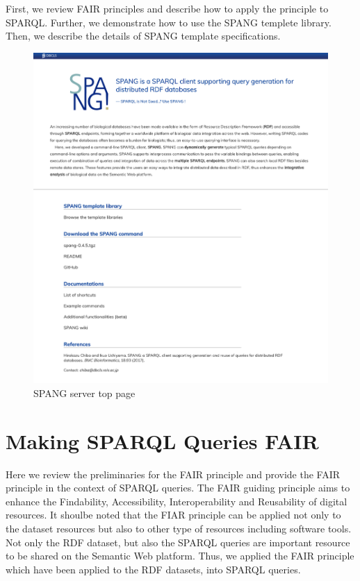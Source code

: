 \documentclass[runningheads]{llncs}
\begin{document}
First, we review FAIR principles and describe how to apply the principle to SPARQL.
Further, we demonstrate how to use the SPANG templete library.
Then, we describe the details of SPANG template specifications.


\begin{figure}
\center
\includegraphics[width=1.0\textwidth]{spang_top.png}
\caption{SPANG server top page}
\label{fig:spang_top}
\end{figure}


\section{Making SPARQL Queries FAIR}

Here we review the preliminaries for the FAIR principle
and provide the FAIR principle in the context of SPARQL queries.
The FAIR guiding principle aims to enhance the Findability, Accessibility, Interoperability and Reusability of digital resources.
It shoulbe noted that the FIAR principle can be applied not only to the dataset resources but also to other type of resources including software tools.
Not only the RDF dataset, but also the SPARQL queries are important resource to be shared on the Semantic Web platform. Thus, we applied the FAIR principle which have been applied to the RDF datasets, into SPARQL queries.
\end{document}
